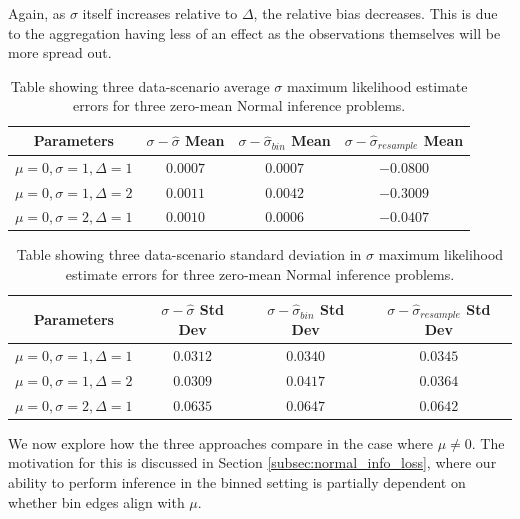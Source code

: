 \documentclass[11pt,a4,twosided,singlespacing,titlepagenumber=on,numbers=endperiod]{scrreprt}
\numberwithin{equation}{chapter} %
\theoremstyle{remark}
\begin{document}
Again, as $\sigma$ itself increases relative to $\Delta$, the relative bias decreases. This is due to the aggregation having less of an effect as the observations themselves will be more spread out.
\begin{table}[ht]
	\centering
	\begin{tabular}{|c|c|c|c|}
	\hline
		Parameters & $\sigma - \hat{\sigma}$ Mean & $\sigma - \hat{\sigma}_{bin}$ Mean & $\sigma - \hat{\sigma}_{resample}$ Mean  \\
	\hline
		$\mu=0, \sigma=1, \Delta=1$ & $0.0007$ & $0.0007$ & $-0.0800$ \\
	\hline
		$\mu=0, \sigma=1, \Delta=2$ & $0.0011$ & $0.0042$ & $-0.3009$ \\
	\hline
		$\mu=0, \sigma=2, \Delta=1$ & $0.0010$ & $0.0006$ & $-0.0407$ \\
	\hline
	\end{tabular}
	\caption{Table showing three data-scenario average $\sigma$ maximum likelihood estimate errors for three zero-mean Normal inference problems.}
	\label{tab:sigma_hat_mean}
\end{table}
\begin{table}[ht]
	\centering
	\begin{tabular}{|c|c|c|c|}
	\hline
	Parameters & $\sigma - \hat{\sigma}$ Std Dev & $\sigma - \hat{\sigma}_{bin}$ Std Dev & $\sigma - \hat{\sigma}_{resample}$ Std Dev \\
	\hline
		$\mu=0, \sigma=1, \Delta=1$ & $0.0312$ & $0.0340$ & $0.0345$ \\
	\hline
		$\mu=0, \sigma=1, \Delta=2$ & $0.0309$ & $0.0417$ & $0.0364$ \\
	\hline
		$\mu=0, \sigma=2, \Delta=1$ & $0.0635$ & $0.0647$ & $0.0642$ \\
	\hline
	\end{tabular}
	\caption{Table showing three data-scenario standard deviation in $\sigma$ maximum likelihood estimate errors for three zero-mean Normal inference problems.}
	\label{tab:sigma_hat_std}
\end{table}
\newpage\noindent
We now explore how the three approaches compare in the case where $\mu \neq 0$. The motivation for this is discussed in Section \ref{subsec:normal_info_loss}, where our ability to perform inference in the binned setting is partially dependent on whether bin edges align with $\mu$.
\end{document}
